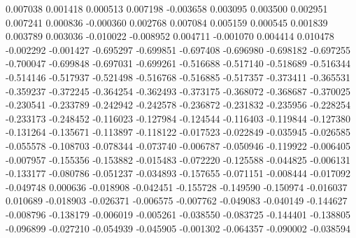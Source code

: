 0.007038
0.001418
0.000513
0.007198
-0.003658
0.003095
0.003500
0.002951
0.007241
0.000836
-0.000360
0.002768
0.007084
0.005159
0.000545
0.001839
0.003789
0.003036
-0.010022
-0.008952
0.004711
-0.001070
0.004414
0.010478
-0.002292
-0.001427
-0.695297
-0.699851
-0.697408
-0.696980
-0.698182
-0.697255
-0.700047
-0.699848
-0.697031
-0.699261
-0.516688
-0.517140
-0.518689
-0.516344
-0.514146
-0.517937
-0.521498
-0.516768
-0.516885
-0.517357
-0.373411
-0.365531
-0.359237
-0.372245
-0.364254
-0.362493
-0.373175
-0.368072
-0.368687
-0.370025
-0.230541
-0.233789
-0.242942
-0.242578
-0.236872
-0.231832
-0.235956
-0.228254
-0.233173
-0.248452
-0.116023
-0.127984
-0.124544
-0.116403
-0.119844
-0.127380
-0.131264
-0.135671
-0.113897
-0.118122
-0.017523
-0.022849
-0.035945
-0.026585
-0.055578
-0.108703
-0.078344
-0.073740
-0.006787
-0.050946
-0.119922
-0.006405
-0.007957
-0.155356
-0.153882
-0.015483
-0.072220
-0.125588
-0.044825
-0.006131
-0.133177
-0.080786
-0.051237
-0.034893
-0.157655
-0.071151
-0.008444
-0.017092
-0.049748
0.000636
-0.018908
-0.042451
-0.155728
-0.149590
-0.150974
-0.016037
0.010689
-0.018903
-0.026371
-0.006575
-0.007762
-0.049083
-0.040149
-0.144627
-0.008796
-0.138179
-0.006019
-0.005261
-0.038550
-0.083725
-0.144401
-0.138805
-0.096899
-0.027210
-0.054939
-0.045905
-0.001302
-0.064357
-0.090002
-0.038594
